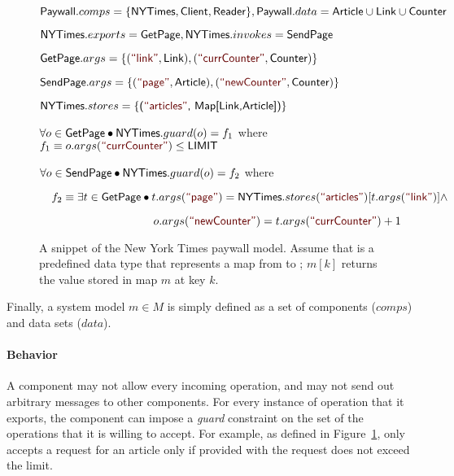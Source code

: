 \begin{figure}[!t]
{\begin{minipage}[t]{0.97\textwidth}
$\textsf{Paywall}.comps = \{\textsf{NYTimes}, \textsf{Client},
\textsf{Reader}\}, \textsf{Paywall}.data = \textsf{Article} \cup \textsf{Link} \cup
\textsf{Counter}$ 


$\textsf{NYTimes}.exports = \textsf{GetPage}, \textsf{NYTimes}.invokes = \textsf{SendPage}$

$\cname{GetPage}.args =
\{(\strlit{link}, \cname{Link}),(\strlit{currCounter}, \cname{Counter})\}$

$\cname{SendPage}.args =
\{(\strlit{page}, \cname{Article}),(\strlit{newCounter}, \cname{Counter})\}$

$\cname{NYTimes}.stores =
\{\cname{(\strlit{articles}, \cname{Map[Link,Article]})}\}$ 


$\forall o \in \textsf{GetPage} \bullet \textsf{NYTimes}.guard(o) = f_1 $
where $f_1 \equiv o.args(\strlit{currCounter}) \leq \cname{LIMIT}$

$\forall o \in \textsf{SendPage} \bullet \textsf{NYTimes}.guard(o) = f_2
$ where

$\quad f_2 \equiv \exists t \in \cname{GetPage} \bullet t.args(\strlit{page}) =
\cname{NYTimes}.stores(\strlit{articles})[t.args(\strlit{link})]
\land$ 

$\quad\quad\quad\quad\quad\quad\quad\quad\quad\quad o.args(\strlit{newCounter}) = t.args(\strlit{currCounter}) + 1$
\end{minipage}
}
\caption{A snippet of the New York Times paywall model. Assume that
   is a predefined data type that represents a map
  from  to ; $m[k]$ returns the value stored in
  map $m$ at key $k$.}
\label{fig-nytimes-spec}
\end{figure}

Finally, a system model $m \in M$ is
simply defined as a set of components ($comps$) and data sets
($data$). 

\paragraph{\textbf{Behavior}} A component may not allow every incoming
operation, and may not send out arbitrary messages to other
components. For every instance of operation that it exports, the
component can impose a \textit{guard} constraint on the set of the
operations that it is willing to accept. For example, as defined in
Figure~\ref{fig-nytimes-spec},  only accepts a request
for an article only if  provided with the request
does not exceed the limit.


